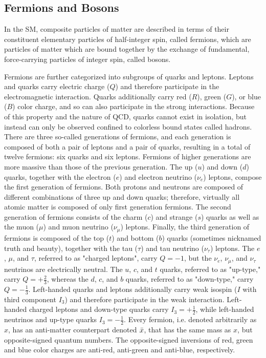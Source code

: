 \subsection{Fermions and Bosons}
In the SM, composite particles of matter are described in terms of their constituent elementary particles of half-integer spin, called fermions, which are particles of matter which are bound together by the exchange of fundamental, force-carrying particles of integer spin, called bosons. 

Fermions are further categorized into subgroups of quarks and leptons.
Leptons and quarks carry electric charge ($Q$) and therefore participate in the electromagnetic interaction.
Quarks additionally carry red ($R$), green ($G$), or blue ($B$) color charge, and so can also participate in the strong interactions.
Because of this property and the nature of QCD, quarks cannot exist in isolation, but instead can only be observed confined to colorless bound states called hadrons.
There are three so-called generations of fermions, and each generation is composed of both a pair of leptons and a pair of quarks, resulting in a total of twelve fermions: six quarks and six leptons.
Fermions of higher generations are more massive than those of the previous generation.
The up ($u$) and down ($d$) quarks, together with the electron ($e$) and electron neutrino ($\nu_e$) leptons, compose the first generation of fermions.
Both protons and neutrons are composed of different combinations of three up and down quarks; therefore, virtually all atomic matter is composed of only first generation fermions.
The second generation of fermions consists of the charm ($c$) and strange ($s$) quarks as well as the muon ($\mu$) and muon neutrino ($\nu_\mu$) leptons.
Finally, the third generation of fermions is composed of the top ($t$) and bottom ($b$) quarks (sometimes nicknamed truth and beauty), together with the tau ($\tau$) and tau neutrino ($\nu_\tau$) leptons.
The $e$, $\mu$, and $\tau$, referred to as "charged leptons", carry $Q = -1$, but the $\nu_e$, $\nu_\mu$, and $\nu_\tau$ neutrinos are electrically neutral.
The $u$, $c$, and $t$ quarks, referred to as "up-type," carry $Q = +\frac{2}{3}$, whereas the $d$, $c$, and $b$ quarks, referred to as "down-type," carry $Q = -\frac{1}{3}$.
Left-handed quarks and leptons additionally carry weak isospin ($I$ with third component $I_3$) and therefore participate in the weak interaction.
Left-handed charged leptons and down-type quarks carry $I_3 = +\frac{1}{2}$, while left-handed neutrinos and up-type quarks $I_3 = -\frac{1}{2}$.
Every fermion, i.e. denoted arbitrarily as $x$, has an anti-matter counterpart denoted $\Bar{x}$, that has the same mass as $x$, but opposite-signed quantum numbers.
The opposite-signed inversions of red, green and blue color charges are anti-red, anti-green and anti-blue, respectively.

